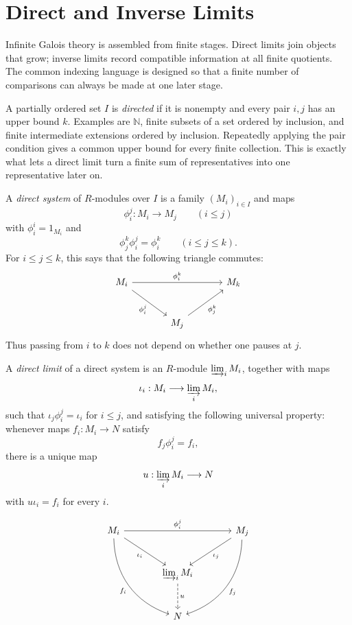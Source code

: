 \section{Direct and Inverse Limits}

Infinite Galois theory is assembled from finite stages.  Direct limits join
objects that grow; inverse limits record compatible information at all finite
quotients.  The common indexing language is designed so that a finite number
of comparisons can always be made at one later stage.

\begin{definition}
A partially ordered set \(I\) is \emph{directed} if it is nonempty and every
pair \(i,j\) has an upper bound \(k\).  Examples are \(\mathbb N\), finite
subsets of a set ordered by inclusion, and finite intermediate extensions
ordered by inclusion.  Repeatedly applying the pair condition gives a common
upper bound for every finite collection.  This is exactly what lets a direct
limit turn a finite sum of representatives into one representative later on.
\end{definition}

\begin{definition}
A \emph{direct system} of \(R\)-modules over \(I\) is a family
\((M_i)_{i\in I}\) and maps
\[
\phi_i^j:M_i\longrightarrow M_j\qquad(i\leq j)
\]
with \(\phi_i^i=1_{M_i}\) and
\[
\phi_j^k\phi_i^j=\phi_i^k
\qquad(i\leq j\leq k).
\]
For \(i\leq j\leq k\), this says that the following triangle commutes:
\[
\begin{tikzcd}[column sep=large,row sep=large]
M_i \arrow[rr,"\phi_i^k"] \arrow[dr,"\phi_i^j"'] && M_k \\
& M_j \arrow[ur,"\phi_j^k"'] &
\end{tikzcd}
\]
Thus passing from \(i\) to \(k\) does not depend on whether one pauses at
\(j\).
\end{definition}

\begin{definition}
A \emph{direct limit} of a direct system is an \(R\)-module
\(\varinjlim_iM_i\), together with maps
\[
\iota_i:M_i\longrightarrow\varinjlim_iM_i,
\]
such that \(\iota_j\phi_i^j=\iota_i\) for \(i\leq j\), and satisfying the
following universal property: whenever maps \(f_i:M_i\to N\) satisfy
\[
f_j\phi_i^j=f_i,
\]
there is a unique map
\[
u:\varinjlim_iM_i\longrightarrow N
\]
with \(u\iota_i=f_i\) for every \(i\).
\end{definition}

\[
\begin{tikzcd}[column sep=large,row sep=large]
M_i \arrow[rr,"\phi_i^j"] \arrow[dr,"\iota_i"'] \arrow[ddr,bend right=35,"f_i"']&&
M_j \arrow[dl,"\iota_j"] \arrow[ddl,bend left=35,"f_j"]\\
&\varinjlim_iM_i \arrow[d,dashed,"u"]\\
&N
\end{tikzcd}
\]

